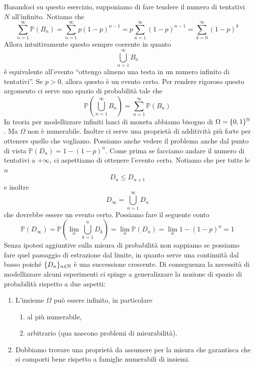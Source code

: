 \documentclass[a4paper]{article}
\begin{document}
Basandoci su questo esercizio, supponiamo di fare tendere il numero
di tentativi \(N\) all'infinito. Notiamo che
\[
    \sum_{n=1}^\infty \mathbb P(B_n)
    = \sum_{n=1}^\infty p(1-p)^{n-1}
    = p \sum_{n=1}^\infty (1-p)^{n-1}
    = \sum_{k=0}^\infty (1-p)^k
\]
Allora intuitivamente questo sempre coerente in quanto
\[
    \bigcup_{n=1}^\infty B_n
\]
è equivalente all'evento ``ottengo almeno una testa in un numero infinito di tentativi''.
Se \(p>0\), allora questo è un evento certo.
Per rendere rigoroso questo argomento ci serve uno
spazio di probabilità tale che
\[
    \mathbb P\left(
        \bigcup_{n=1}^\infty B_n
    \right) = \sum_{n=1}^\infty \mathbb P(B_n)
\]
In teoria per modellizzare infiniti lanci di moneta
abbiamo bisogno di \(\Omega = \{0,1\}^{\mathbb{N}}\).
Ma \(\Omega\) non è numerabile. Inoltre ci serve una proprietà
di additività più forte per ottenere
quello che vogliamo.
Possiamo anche vedere il problema
anche dal punto di vista \(\mathbb P(D_n) = 1 - (1-p)^n\).
Come prima se facciamo andare il numero di tentativi a
\(+\infty\), ci aspettiamo di ottenere l'evento certo.
Notiamo che per tutte le \(n\) \[
    D_n \leq D_{n+1}
\]
e inoltre \[
    D_\infty = \bigcup_{n=1}^\infty D_n
\]
che dovrebbe essere un evento certo.
Possiamo fare il seguente conto
\[
    \mathbb P(D_\infty) = \mathbb P\left(
        \lim_n \bigcup_{k=1}^n D_k
    \right) = \lim_n \mathbb P(D_n)
    = \lim_n 1 - (1-p)^n = 1
\]
Senza ipotesi aggiuntive sulla misura di probabilità non sappiamo
se possiamo fare quel passaggio di estrazione dal limite,
in quanto serve una continuità dal basso poiché
\(\{D_n\}_{n \in \mathbb{N}}\) è una successione crescente.
Di conseguenza la necessità di modellizzare alcuni esperimenti
ci spinge a generalizzare la nozione di spazio di probabilità
rispetto a due aspetti:
\begin{enumerate}
    \item L'insieme \(\Omega\) può essere infinito, in particolare
        \begin{enumerate}
            \item al più numerabile,
            \item arbitrario (qua nascono problemi di misurabilità).
        \end{enumerate}
    \item Dobbiamo trovare una proprietà da assumere per la misura che garantisca che si comporti bene rispetto a
        famiglie numerabili di insiemi.
\end{enumerate}
\end{document}
